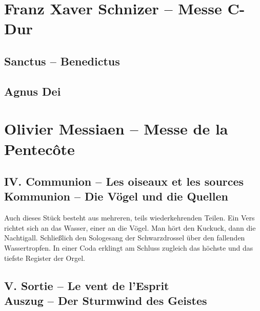 \documentclass[a5paper,twoside,fontsize=10pt]{scrartcl}
\newcommand{\frenchandgermantitle}[2]{\subsection*{#1 \\#2}}
\begin{document}
\section*{Franz Xaver Schnizer – Messe C-Dur}
\subsection*{Sanctus -- Benedictus}
\begin{Parallel}{0.45\textwidth}{0.5\textwidth}
    \RaggedRight
    
\end{Parallel}
\vspace{\baselineskip}

\subsection*{Agnus Dei}
\begin{Parallel}{0.45\textwidth}{0.5\textwidth}
    \RaggedRight
    
\end{Parallel}
\vspace{\baselineskip}

\newpage
\section*{Olivier Messiaen – Messe de la Pentecôte }
\frenchandgermantitle{IV. Communion – Les oiseaux et les sources}{Kommunion – Die Vögel und die Quellen}

\medskip

\noindent{}
Auch dieses Stück besteht aus mehreren, teils wiederkehrenden Teilen.
Ein Vers richtet sich an das Wasser, einer an die Vögel.
Man hört den Kuckuck, dann die Nachtigall.
Schließlich den Sologesang der Schwarzdrossel über den fallenden Wassertropfen.
In einer Coda erklingt am Schluss zugleich das höchste und das tiefste Register der Orgel.

\frenchandgermantitle{V. Sortie – Le vent de l’Esprit}{Auszug – Der Sturmwind des Geistes}
\end{document}
